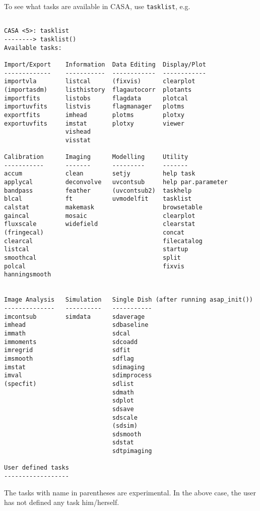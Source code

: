 To see what tasks are available in CASA, use {\tt tasklist}, e.g.
\small
\begin{verbatim}

CASA <5>: tasklist
--------> tasklist()
Available tasks: 

Import/Export    Information  Data Editing  Display/Plot
-------------    -----------  ------------  ------------
importvla        listcal      (fixvis)      clearplot
(importasdm)     listhistory  flagautocorr  plotants 
importfits       listobs      flagdata      plotcal
importuvfits     listvis      flagmanager   plotms
exportfits       imhead       plotms        plotxy
exportuvfits     imstat       plotxy        viewer
                 vishead
                 visstat

Calibration      Imaging      Modelling     Utility
-----------      -------      ---------     -------
accum            clean        setjy         help task
applycal         deconvolve   uvcontsub     help par.parameter
bandpass         feather      (uvcontsub2)  taskhelp
blcal            ft           uvmodelfit    tasklist
calstat          makemask                   browsetable
gaincal          mosaic                     clearplot
fluxscale        widefield                  clearstat
(fringecal)                                 concat
clearcal                                    filecatalog
listcal                                     startup
smoothcal                                   split
polcal                                      fixvis
hanningsmooth
                                                 

Image Analysis   Simulation   Single Dish (after running asap_init())
--------------   ----------   -----------
imcontsub        simdata      sdaverage
imhead                        sdbaseline
immath                        sdcal
immoments                     sdcoadd
imregrid                      sdfit
imsmooth                      sdflag
imstat                        sdimaging
imval                         sdimprocess
(specfit)                     sdlist
                              sdmath
                              sdplot
                              sdsave
                              sdscale
                              (sdsim)
                              sdsmooth
                              sdstat
                              sdtpimaging

User defined tasks
------------------

\end{verbatim}
\normalsize
The tasks with name in parentheses are experimental. In the above
case, the user has not defined any task him/herself.

